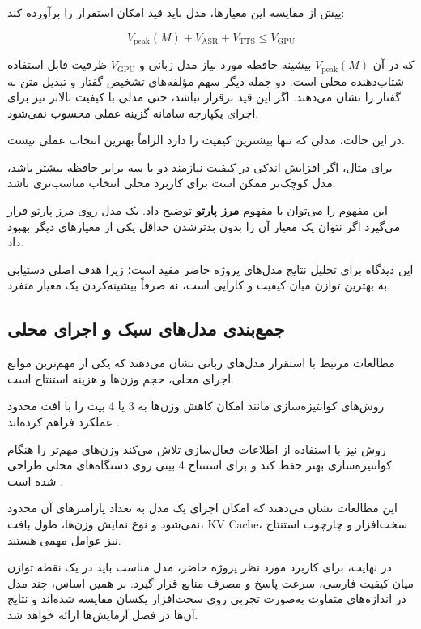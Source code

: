 پیش از مقایسه این معیارها، مدل باید قید امکان استقرار را برآورده کند:

\begin{equation}
V_{\mathrm{peak}}(M) + V_{\mathrm{ASR}} + V_{\mathrm{TTS}}
\leq V_{\mathrm{GPU}}
\end{equation}

که در آن $V_{\mathrm{peak}}(M)$ بیشینه حافظه مورد نیاز مدل زبانی و
$V_{\mathrm{GPU}}$ ظرفیت قابل استفاده شتاب‌دهنده محلی است. دو جمله
دیگر سهم مؤلفه‌های تشخیص گفتار و تبدیل متن به گفتار را نشان می‌دهند.
اگر این قید برقرار نباشد، حتی مدلی با کیفیت بالاتر نیز برای اجرای
یکپارچه سامانه گزینه عملی محسوب نمی‌شود.

در این حالت، مدلی که تنها بیشترین کیفیت را دارد الزاماً
بهترین انتخاب عملی نیست.

برای مثال، اگر افزایش اندکی در کیفیت نیازمند دو یا سه برابر
حافظه بیشتر باشد، مدل کوچک‌تر ممکن است برای کاربرد محلی
انتخاب مناسب‌تری باشد.

این مفهوم را می‌توان با مفهوم
\textbf{مرز پارتو}
توضیح داد.
یک مدل روی مرز پارتو قرار می‌گیرد اگر نتوان یک معیار آن را
بدون بدترشدن حداقل یکی از معیارهای دیگر بهبود داد.

این دیدگاه برای تحلیل نتایج مدل‌های پروژه حاضر مفید است؛
زیرا هدف اصلی دستیابی به بهترین توازن میان کیفیت و کارایی
است، نه صرفاً بیشینه‌کردن یک معیار منفرد.


\subsection{جمع‌بندی مدل‌های سبک و اجرای محلی}

مطالعات مرتبط با استقرار مدل‌های زبانی نشان می‌دهند که یکی
از مهم‌ترین موانع اجرای محلی، حجم وزن‌ها و هزینه استنتاج است.

روش‌های کوانتیزه‌سازی مانند  امکان کاهش وزن‌ها به 3 یا
4 بیت را با افت محدود عملکرد فراهم کرده‌اند
\cite{frantar2022gptq}.

روش  نیز با استفاده از اطلاعات فعال‌سازی تلاش می‌کند
وزن‌های مهم‌تر را هنگام کوانتیزه‌سازی بهتر حفظ کند و برای
استنتاج 4 بیتی روی دستگاه‌های محلی طراحی شده است
\cite{lin2023awq}.

این مطالعات نشان می‌دهند که امکان اجرای یک مدل به تعداد
پارامترهای آن محدود نمی‌شود و نوع نمایش وزن‌ها، طول بافت،
KV Cache، سخت‌افزار و چارچوب استنتاج نیز عوامل مهمی هستند.

در نهایت، برای کاربرد مورد نظر پروژه حاضر، مدل مناسب باید
در یک نقطه توازن میان کیفیت فارسی، سرعت پاسخ و مصرف منابع
قرار گیرد.
بر همین اساس، چند مدل در اندازه‌های متفاوت به‌صورت تجربی
روی سخت‌افزار یکسان مقایسه شده‌اند و نتایج آن‌ها در فصل
آزمایش‌ها ارائه خواهد شد.
